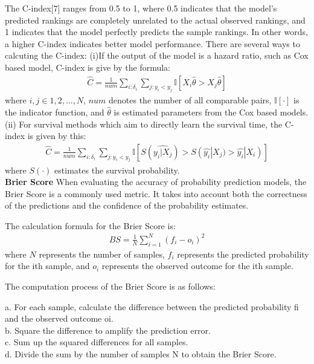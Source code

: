 \documentclass[conference]{IEEEconf}
\begin{document}
The C-index[7] ranges from 0.5 to 1, where 0.5 indicates that the model's predicted rankings are completely unrelated to the actual observed rankings, and 1 indicates that the model perfectly predicts the sample rankings. In other words, a higher C-index indicates better model performance.
There are several ways to calcuting the C-index:
(i)If the output of the model is a hazard ratio, such as Cox based model, C-index is give by the formula: 
\begin{eqnarray}
	\hat{C}=\frac{1}{num}\sum_{i:\delta_{i}}^{}\sum_{j:y_{i}<y_{j}}^{}\mathbb{I}[X_{i}\hat{\theta}>X_{j}\hat{\theta}]
\end{eqnarray}
where $i,j\in{1,2,...,N}$, $num$ denotes the number of all comparable pairs, $\mathbb{I}[\cdot]$ is the indicator function, and $\hat{\theta}$ is estimated parameters from the Cox based models.
(ii) For survival methods which aim to directly learn the survival time, the C-index is given by this:
\begin{eqnarray}
	\hat{C}=\frac{1}{num}\sum_{i:\delta_{i}}^{}\sum_{j:y_{i}<y_{j}}^{}\mathbb{I}[S(\hat{y_{i}|X_{j}})>S(\hat{y_{i}}|X_{j})>\hat{y_{i}}|X_{i})]
\end{eqnarray}
where $S(\cdot)$ estimates the survival probability.\\

\textbf{Brier Score} When evaluating the accuracy of probability prediction models, the Brier Score is a commonly used metric. It takes into account both the correctness of the predictions and the confidence of the probability estimates.

The calculation formula for the Brier Score is:
\begin{eqnarray}
	BS = \frac{1}{N} \sum_{i=1}^{N} (f_i - o_i)^2
\end{eqnarray}
where $N$ represents the number of samples, $f_{i}$ represents the predicted probability for the ith sample, and $o_{i}$ represents the observed outcome for the ith sample.

The computation process of the Brier Score is as follows:

a. For each sample, calculate the difference between the predicted probability fi and the observed outcome oi.\\
b. Square the difference to amplify the prediction error.\\
c. Sum up the squared differences for all samples.\\
d. Divide the sum by the number of samples N to obtain the Brier Score.\\
\end{document}
